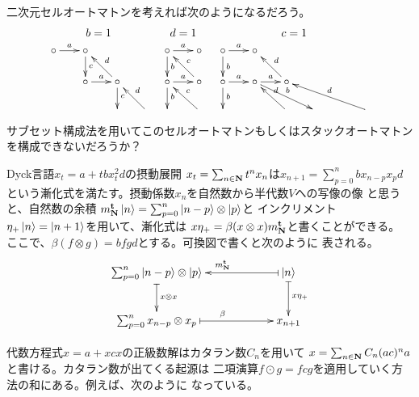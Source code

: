 {\begin{description}
		二次元セルオートマトンを考えれば次のようになるだろう。
		\begin{equation*}\begin{array}{ccc}
			b = 1 & d = 1 & c = 1 \\
			\xymatrix@R=4ex@C=4ex{
				\circ \ar[r]^a & \circ \ar[d]^c \\
				& \circ \ar[r]^a & \circ \ar[d]^c\ar[ul]_d \\
				& & & \ar[ul]_d \\
			} & \xymatrix@R=4ex@C=4ex{
				\circ \ar[d]^b \ar[r]^a & \circ \\
				\circ \ar[r]^a \ar[d]^b & \circ \ar[ul]_c \\
				& \ar[ul]_c \\
			} & \xymatrix@R=4ex@C=4ex{
				\circ \ar[d]^b \ar[r]^a & \circ \\
				\circ \ar[r]^a \ar[d]^b & \circ \ar[r]^a \ar[drr]^b 
					& \circ \ar[ul]_d \\
				& & \ar[ul]_d & & & \ar[ulll]_d \\
			}
		\end{array}\end{equation*}
		サブセット構成法を用いてこのセルオートマトンもしくはスタックオートマトン
		を構成できないだろうか？
		\item[摂動] Dyck言語$x_t=a+tbx_t^2d$の摂動展開
		$x_t=\sum_{n\in\mathbf{N}}t^nx_n$は$x_{n+1}=\sum_{p=0}^nbx_{n-p}x_pd$
		という漸化式を満たす。摂動係数$x_n$を自然数から半代数$V$への写像の像
		と思うと、自然数の余積
		$m_{\mathbf{N}}^{\mathbf{t}}\mathinner{|{n}\rangle}=\sum_{p=0}^n\mathinner{|{n-p}\rangle}\otimes\mathinner{|{p}\rangle}$と
		インクリメント$\eta_+\mathinner{|{n}\rangle}=\mathinner{|{n+1}\rangle}$を用いて、漸化式は
		$x\eta_+=\beta(x\otimes x)m_{\mathbf{N}}^{\mathbf{t}}$と書くことができる。
		ここで、$\beta(f\otimes g)=bfgd$とする。可換図で書くと次のように
		表される。
		\begin{equation*}\xymatrix@C=6em{
			\sum_{p=0}^n \ket{n-p}\otimes\ket{p} \ar@{|->}[d]^{x\otimes x}
				& \ket{n} \ar@{|->}[l]_{m_\sizen^\tran} \ar@{|->}[d]^{x\eta_+} \\
			\sum_{p=0}^n x_{n-p}\otimes x_{p} \ar@{|->}[r]^\beta & x_{n+1} \\
		}\end{equation*}
		\item[優先順位] 代数方程式$x=a+xcx$の正級数解はカタラン数$C_n$を用いて
		$x=\sum_{n\in\mathbf{N}}C_n(ac)^na$と書ける。カタラン数が出てくる起源は
		二項演算$f\odot g=fcg$を適用していく方法の和にある。例えば、次のように
		なっている。
		\begin{equation*}\begin{split}

\end{split}
\end{equation*}
\end{description}}
